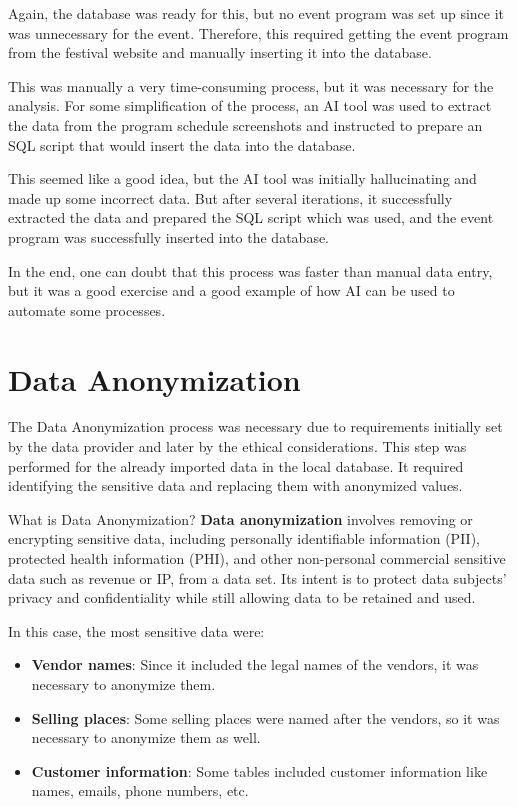 Again, the database was ready for this, but no event program was set up since it was unnecessary for the event.
Therefore, this required getting the event program from the festival website and manually inserting it into the database.

This was manually a very time-consuming process, but it was necessary for the analysis.
For some simplification of the process, an AI tool was used to extract the data from the program schedule screenshots and instructed to prepare an SQL script that would insert the data into the database.

This seemed like a good idea, but the AI tool was initially hallucinating and made up some incorrect data.
But after several iterations, it successfully extracted the data and prepared the SQL script which was used, and the event program was successfully inserted into the database.

In the end, one can doubt that this process was faster than manual data entry, but it was a good exercise and a good example of how AI can be used to automate some processes.


\section{Data Anonymization}
\label{sec:data-methodology-anonymization}
The Data Anonymization process was necessary due to requirements initially set by the data provider and later by the ethical considerations.
This step was performed for the already imported data in the local database.
It required identifying the sensitive data and replacing them with anonymized values.

\begin{infobox}{What is Data Anonymization?}
	\textbf{Data anonymization} involves removing or encrypting sensitive data, including personally identifiable information (PII), protected health information (PHI), and other non-personal commercial sensitive data such as revenue or IP, from a data set.
	Its intent is to protect data subjects' privacy and confidentiality while still allowing data to be retained and used\cite{hd_data_anonymization_techniques}.
\end{infobox}

In this case, the most sensitive data were:
\begin{itemize}
	\item \textbf{Vendor names}: Since it included the legal names of the vendors, it was necessary to anonymize them.
	\item \textbf{Selling places}: Some selling places were named after the vendors, so it was necessary to anonymize them as well.
	\item \textbf{Customer information}: Some tables included customer information like names, emails, phone numbers, etc.
\end{itemize}

